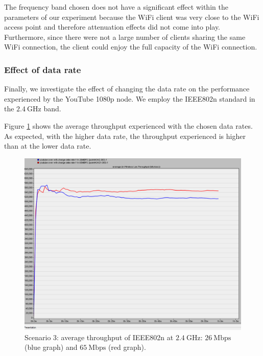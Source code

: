 The frequency band chosen does not have a significant effect within the parameters of our experiment because the \gls{WiFi} client was very close to the \gls{WiFi} access point and therefore attenuation effects did not come into play. Furthermore, since there were not a large number of clients sharing the same \gls{WiFi} connection, the client could enjoy the full capacity of the \gls{WiFi} connection.

\subsubsection{Effect of data rate} \label{subsub:3:data}
Finally, we investigate the effect of changing the data rate on the performance experienced by the YouTube 1080p node. We employ the \gls{IEEE802}n standard in the $2.4~\mathrm{GHz}$ band.

Figure \ref{fig:3:5} shows the average throughput experienced with the chosen data rates. As expected, with the higher data rate, the throughput experienced is higher than at the lower data rate.

\begin{figure}[H]
	\centering
	\includegraphics[scale=0.3]{Figures/amantianrenamed/Scenario3AverageThroughputof802.11n26Mbps2.4GHzand802.11n65Mbps2.4GHz.png}
	\caption[Scenario 3: average throughput according to data rate]{Scenario 3: average throughput of \gls{IEEE802}n at $2.4~\mathrm{GHz}$: $26~\mathrm{Mbps}$ (blue graph) and $65~\mathrm{Mbps}$ (red graph). }
	\label{fig:3:5}
\end{figure}

